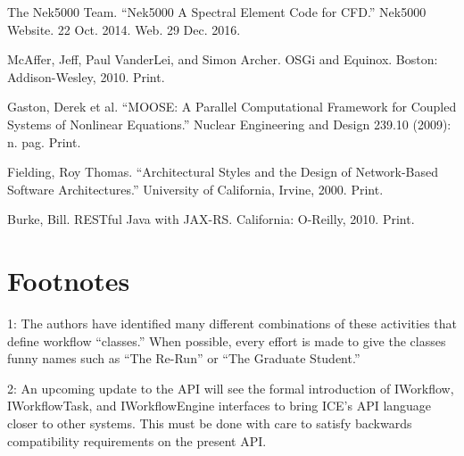 The Nek5000 Team. ``Nek5000 \textbar{} A Spectral Element Code for
CFD.'' Nek5000 Website. 22 Oct. 2014. Web. 29 Dec. 2016.

McAffer, Jeff, Paul VanderLei, and Simon Archer. OSGi and Equinox.
Boston: Addison-Wesley, 2010. Print.

Gaston, Derek et al. ``MOOSE: A Parallel Computational Framework for
Coupled Systems of Nonlinear Equations.'' Nuclear Engineering and Design
239.10 (2009): n. pag. Print.

Fielding, Roy Thomas. ``Architectural Styles and the Design of
Network-Based Software Architectures.'' University of California,
Irvine, 2000. Print.

Burke, Bill. RESTful Java with JAX-RS. California: O-Reilly, 2010.
Print.

\section{Footnotes}\label{footnotes}

1: The authors have identified many different combinations of these
activities that define workflow ``classes.'' When possible, every effort
is made to give the classes funny names such as ``The Re-Run'' or ``The
Graduate Student.''

2: An upcoming update to the API will see the formal introduction of
IWorkflow, IWorkflowTask, and IWorkflowEngine interfaces to bring ICE's
API language closer to other systems. This must be done with care to
satisfy backwards compatibility requirements on the present API.
